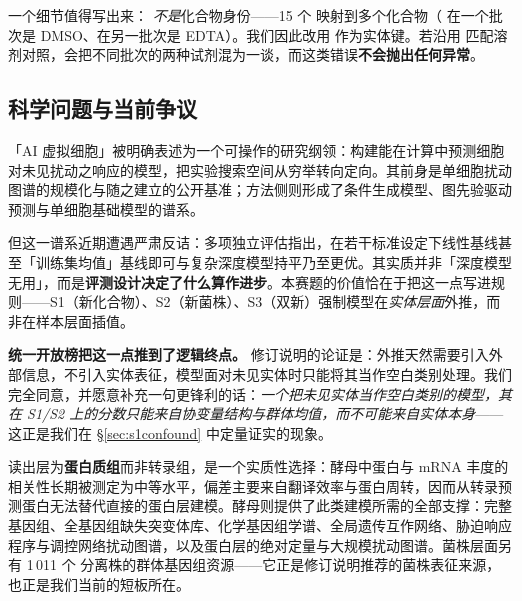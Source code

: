 一个细节值得写出来： \emph{不是}化合物身份——15 个  映射到多个化合物（ 在一个批次是 DMSO、在另一批次是 EDTA）。我们因此改用  作为实体键。若沿用  匹配溶剂对照，会把不同批次的两种试剂混为一谈，而这类错误\textbf{不会抛出任何异常}。

\subsection{科学问题与当前争议}

「AI 虚拟细胞」被明确表述为一个可操作的研究纲领：构建能在计算中预测细胞对未见扰动之响应的模型，把实验搜索空间从穷举转向定向\citep{Bunne2024VirtualCell}。其前身是单细胞扰动图谱的规模化\citep{Dixit2016PerturbSeq,Replogle2022GenomeScale,Norman2019GIManifolds}与随之建立的公开基准\citep{Rood2024PerturbationAtlas,Roohani2025VirtualCellChallenge,Luecken2025OpenProblems}；方法侧则形成了条件生成模型\citep{Lotfollahi2019scGen,Lotfollahi2023CPA,Hetzel2022chemCPA}、图先验驱动预测\citep{Roohani2024GEARS}与单细胞基础模型\citep{Cui2024scGPT,Theodoris2023Geneformer,Adduri2025State}的谱系。

但这一谱系近期遭遇严肃反诘：多项独立评估指出，在若干标准设定下线性基线甚至「训练集均值」基线即可与复杂深度模型持平乃至更优\citep{AhlmannEltze2025LinearBaselines,Kernfeld2025ExpressionForecasting,Csendes2025BenchmarkingFoundation,Wei2026scPerturBench}。其实质并非「深度模型无用」，而是\textbf{评测设计决定了什么算作进步}。本赛题的价值恰在于把这一点写进规则——S1（新化合物）、S2（新菌株）、S3（双新）强制模型在\emph{实体层面}外推，而非在样本层面插值。

\textbf{统一开放榜把这一点推到了逻辑终点。} 修订说明的论证是：外推天然需要引入外部信息，不引入实体表征，模型面对未见实体时只能将其当作空白类别处理。我们完全同意，并愿意补充一句更锋利的话：\emph{一个把未见实体当作空白类别的模型，其在 S1/S2 上的分数只能来自协变量结构与群体均值，而不可能来自实体本身}——这正是我们在 \S\ref{sec:s1confound} 中定量证实的现象。

读出层为\textbf{蛋白质组}而非转录组，是一个实质性选择：酵母中蛋白与 mRNA 丰度的相关性长期被测定为中等水平\citep{Gygi1999Correlation}，偏差主要来自翻译效率与蛋白周转\citep{Vogel2012Insights,Liu2016Dependency}，因而从转录预测蛋白无法替代直接的蛋白层建模。酵母则提供了此类建模所需的全部支撑：完整基因组\citep{Goffeau1996Life6000,engel2022sgd}、全基因组缺失突变体库\citep{Giaever2002DeletionCollection}、化学基因组学谱\citep{Hillenmeyer2008ChemicalGenomics}、全局遗传互作网络\citep{Costanzo2016GlobalGI}、胁迫响应程序\citep{Gasch2000ESR}与调控网络扰动图谱\citep{Kemmeren2014RegulatoryNetworks}，以及蛋白层的绝对定量与大规模扰动图谱\citep{Lahtvee2017AbsoluteQuant,Ho2018ProteomeUnification,Messner2023ProteomicLandscape}。菌株层面另有 1\,011 个 \Sc{} 分离株的群体基因组资源\citep{peter2018_1011genomes}——它正是修订说明推荐的菌株表征来源，也正是我们当前的短板所在。


